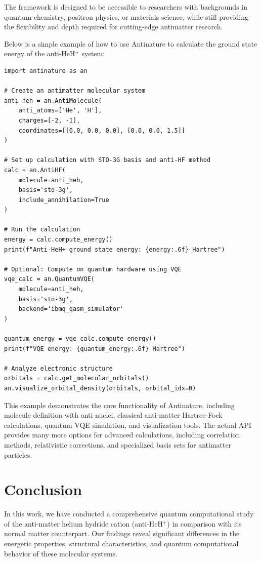 \documentclass[10pt,twocolumn,a4paper]{article}
\begin{document}
The framework is designed to be accessible to researchers with backgrounds in quantum chemistry, positron physics, or materials science, while still providing the flexibility and depth required for cutting-edge antimatter research.

Below is a simple example of how to use Antinature to calculate the ground state energy of the anti-HeH$^+$ system:

\begin{verbatim}
import antinature as an

# Create an antimatter molecular system
anti_heh = an.AntiMolecule(
    anti_atoms=['He', 'H'],
    charges=[-2, -1],
    coordinates=[[0.0, 0.0, 0.0], [0.0, 0.0, 1.5]]
)

# Set up calculation with STO-3G basis and anti-HF method
calc = an.AntiHF(
    molecule=anti_heh, 
    basis='sto-3g',
    include_annihilation=True
)

# Run the calculation
energy = calc.compute_energy()
print(f"Anti-HeH+ ground state energy: {energy:.6f} Hartree")

# Optional: Compute on quantum hardware using VQE
vqe_calc = an.QuantumVQE(
    molecule=anti_heh,
    basis='sto-3g',
    backend='ibmq_qasm_simulator'
)

quantum_energy = vqe_calc.compute_energy()
print(f"VQE energy: {quantum_energy:.6f} Hartree")

# Analyze electronic structure
orbitals = calc.get_molecular_orbitals()
an.visualize_orbital_density(orbitals, orbital_idx=0)
\end{verbatim}

This example demonstrates the core functionality of Antinature, including molecule definition with anti-nuclei, classical anti-matter Hartree-Fock calculations, quantum VQE simulation, and visualization tools. The actual API provides many more options for advanced calculations, including correlation methods, relativistic corrections, and specialized basis sets for antimatter particles.

\section{Conclusion}
In this work, we have conducted a comprehensive quantum computational study of the anti-matter helium hydride cation (anti-HeH$^+$) in comparison with its normal matter counterpart. Our findings reveal significant differences in the energetic properties, structural characteristics, and quantum computational behavior of these molecular systems.
\end{document}
